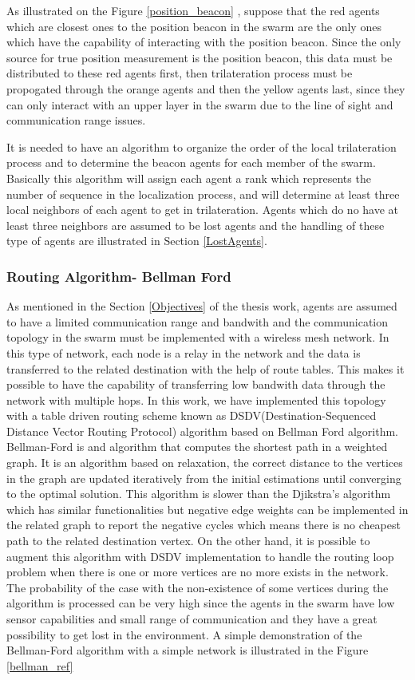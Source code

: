 As illustrated on the Figure \ref{position_beacon} , suppose that the red agents which are closest ones to the position beacon in the swarm are the only ones which have the capability of interacting with the position beacon. Since the only source for true position measurement is the position beacon, this data must be distributed to these red agents first, then trilateration process must be propogated through the orange agents and then the yellow agents last, since they can only interact with an upper layer in the swarm due to the line of sight and communication range issues.

It is needed to have an algorithm to organize the order of the local trilateration process and to determine the beacon agents for each member of the swarm. Basically this algorithm will assign each agent a rank which represents the number of sequence in the localization process, and will determine at least three local neighbors of each agent to get in trilateration. Agents which do no have at least three neighbors are assumed to be lost agents and the handling of these type of agents are illustrated in Section \ref{LostAgents}.
	
\subsubsection{Routing Algorithm- Bellman Ford}
As mentioned in the Section \ref{Objectives} of the thesis work, agents are assumed to have a limited communication range and bandwith and the communication topology in the swarm must be implemented with a wireless mesh network. In this type of network, each node is a relay in the network and the data is transferred to the related destination with the help of route tables. This makes it possible to have the capability of transferring low bandwith data through the network with multiple hops.  In this work, we have implemented this topology with a table driven routing scheme known as DSDV(Destination-Sequenced Distance Vector Routing Protocol) algorithm based on Bellman Ford algorithm. Bellman-Ford is and algorithm that computes the shortest path in a weighted graph. It is an algorithm based on relaxation, the correct distance to the vertices in the graph are updated iteratively from the initial estimations until converging to the optimal solution. This algorithm is slower than the Djikstra's algorithm which has similar functionalities but negative edge weights can be implemented in the related graph to report the negative cycles which means there is no cheapest path to the related destination vertex. On the other hand, it is possible to augment this algorithm with DSDV implementation to handle the routing loop problem when there is one or more vertices are no more exists in the network. The probability of the case with the non-existence of some vertices during the algorithm is processed can be very high since the agents in the swarm have low sensor capabilities and small range of communication and they have a great possibility to get lost in the environment. A simple demonstration of the Bellman-Ford algorithm with a simple network is illustrated in the Figure \ref{bellman_ref}
	
